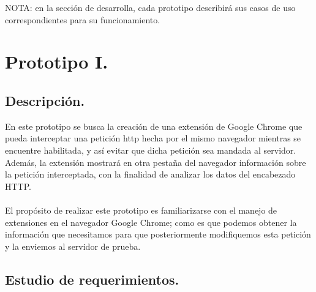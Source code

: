 \documentclass[12pt, a4paper, titlepage]{report}
\begin{document}
	        NOTA: en la sección de desarrolla, cada prototipo describirá sus casos de uso correspondientes para su funcionamiento.
	        
		\newpage
		\section{Prototipo I.}
			\subsection{Descripción.}
				En este prototipo se busca la creación de una extensión de Google Chrome que pueda interceptar una petición \acrshort{http} hecha por el mismo navegador mientras se encuentre habilitada, y así evitar que dicha petición sea mandada al servidor. Además, la extensión mostrará en otra pestaña del navegador información sobre la petición interceptada, con la finalidad de analizar los datos del encabezado HTTP. \\\\
				El propósito de realizar este prototipo es familiarizarse con el manejo de extensiones en el navegador Google Chrome; como es que podemos obtener la información que necesitamos para que posteriormente modifiquemos esta petición y la enviemos al servidor de prueba. 
			
			
			
            
			\subsection{Estudio de requerimientos.}
\end{document}

